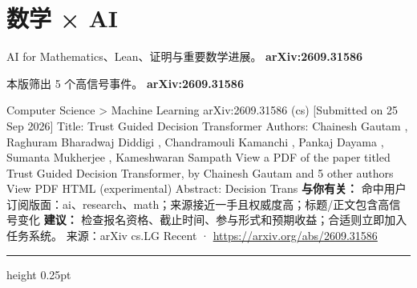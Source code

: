 \documentclass[10.5pt]{ctexart}
\begin{document}
\section*{数学 × AI}
{\color{ormuted} AI for Mathematics、Lean、证明与重要数学进展。}
\vspace{2mm}
{\LARGE\bfseries arXiv:2609.31586}\par
\vspace{1mm}
{\color{ormuted} 本版筛出 5 个高信号事件。}
\vspace{3mm}
{\Large\bfseries arXiv:2609.31586}\par
Computer Science > Machine Learning arXiv:2609.31586 (cs) [Submitted on 25 Sep 2026] Title: Trust Guided Decision Transformer Authors: Chainesh Gautam , Raghuram Bharadwaj Diddigi , Chandramouli Kamanchi , Pankaj Dayama , Sumanta Mukherjee , Kameshwaran Sampath View a PDF of the paper titled Trust Guided Decision Transformer, by Chainesh Gautam and 5 other authors View PDF HTML (experimental) Abstract: Decision Trans
\textbf{与你有关：} 命中用户订阅版面：ai、research、math；来源接近一手且权威度高；标题/正文包含高信号变化
\textbf{建议：} 检查报名资格、截止时间、参与形式和预期收益；合适则立即加入任务系统。
{\footnotesize\color{ormuted} 来源：arXiv cs.LG Recent · \url{https://arxiv.org/abs/2609.31586}}
\vspace{4mm}
\hrule height 0.25pt
\vspace{3mm}
\end{document}
